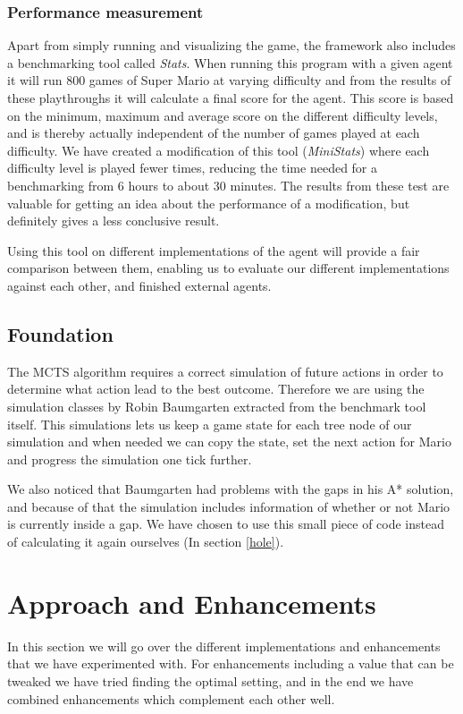 \documentclass[10pt,a4paper]{article}
\begin{document}
\subsubsection{Performance measurement}
\label{benchmark}
Apart from simply running and visualizing the game, the framework also includes a benchmarking tool called \emph{Stats}. When running this program with a given agent it will run 800 games of Super Mario at varying difficulty and from the results of these playthroughs it will calculate a final score for the agent. This score is based on the minimum, maximum and average score on the different difficulty levels, and is thereby actually independent of the number of games played at each difficulty. We have created a modification of this tool (\emph{MiniStats}) where each difficulty level is played fewer times, reducing the time needed for a benchmarking from 6 hours to about 30 minutes. The results from these test are valuable for getting an idea about the performance of a modification, but definitely gives a less conclusive result.

Using this tool on different implementations of the agent will provide a fair comparison between them, enabling us to evaluate our different implementations against each other, and finished external agents.

\subsection{Foundation}
The MCTS algorithm requires a correct simulation of future actions in order to determine what action lead to the best outcome. Therefore we are using the simulation classes by Robin Baumgarten extracted from the benchmark tool itself. This simulations lets us keep a game state for each tree node of our simulation and when needed we can copy the state, set the next action for Mario and progress the simulation one tick further.

We also noticed that Baumgarten had problems with the gaps in his A* solution, and because of that the simulation includes information of whether or not Mario is currently inside a gap. We have chosen to use this small piece of code instead of calculating it again ourselves (In section \ref{hole}).

\clearpage

\section{Approach and Enhancements}
In this section we will go over the different implementations and enhancements that we have experimented with. For enhancements including a value that can be tweaked we have tried finding the optimal setting, and in the end we have combined enhancements which complement each other well.
\end{document}

